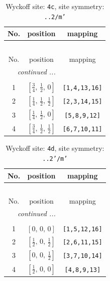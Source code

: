 \documentclass[fleqn,8pt]{jsarticle}
\begin{document}
\renewcommand{\arraystretch}{1.2}
\begin{longtable}{ccc}
\caption{Wyckoff site: {\tt 4c}, site symmetry: {\tt ..2/m'}}
 \\
 \hline \hline
No. & position & mapping \\ \hline \endfirsthead

\multicolumn{2}{l}{\tablename\ \thetable{}} \\
 \hline \hline
No. & position & mapping \\ \hline \endhead

 \hline \hline
\multicolumn{2}{r}{\footnotesize\it continued ...} \\ \endfoot

 \hline \hline
\multicolumn{2}{r}{} \\ \endlastfoot

1 & $\left[ \frac{3}{4},\, \frac{1}{2},\, 0 \right]$ & {\tt [1,4,13,16]} \\ \hline
2 & $\left[ \frac{1}{4},\, \frac{1}{2},\, \frac{1}{2} \right]$ & {\tt [2,3,14,15]} \\ \hline
3 & $\left[ \frac{1}{4},\, \frac{1}{2},\, 0 \right]$ & {\tt [5,8,9,12]} \\ \hline
4 & $\left[ \frac{3}{4},\, \frac{1}{2},\, \frac{1}{2} \right]$ & {\tt [6,7,10,11]} \\
\end{longtable}
\renewcommand{\arraystretch}{1.2}
\begin{longtable}{ccc}
\caption{Wyckoff site: {\tt 4d}, site symmetry: {\tt ..2'/m'}}
 \\
 \hline \hline
No. & position & mapping \\ \hline \endfirsthead

\multicolumn{2}{l}{\tablename\ \thetable{}} \\
 \hline \hline
No. & position & mapping \\ \hline \endhead

 \hline \hline
\multicolumn{2}{r}{\footnotesize\it continued ...} \\ \endfoot

 \hline \hline
\multicolumn{2}{r}{} \\ \endlastfoot

1 & $\left[ 0,\, 0,\, 0 \right]$ & {\tt [1,5,12,16]} \\ \hline
2 & $\left[ \frac{1}{2},\, 0,\, \frac{1}{2} \right]$ & {\tt [2,6,11,15]} \\ \hline
3 & $\left[ 0,\, 0,\, \frac{1}{2} \right]$ & {\tt [3,7,10,14]} \\ \hline
4 & $\left[ \frac{1}{2},\, 0,\, 0 \right]$ & {\tt [4,8,9,13]} \\
\end{longtable}
\end{document}
